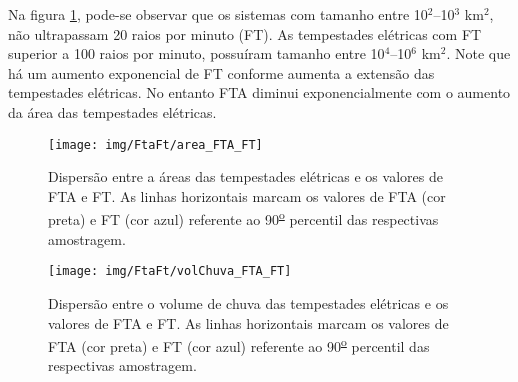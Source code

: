 Na figura \ref{areaFTAFTA}, pode-se observar que os sistemas com tamanho entre 10$^2$--10$^3$ km$^2$, não ultrapassam 20 raios por minuto (FT). As tempestades elétricas com FT superior a 100 raios por minuto, possuíram tamanho entre 10$^{4}$--10$^{6}$ km$^2$. Note que há um aumento exponencial de FT conforme aumenta a extensão das tempestades elétricas. No entanto FTA diminui exponencialmente com o aumento da área das tempestades elétricas.


\begin{figure}[!ht]
  \centering
  \texttt{[image: img/FtaFt/area\_FTA\_FT]}   
  \caption{Dispersão entre a áreas das tempestades elétricas e os valores de FTA e FT. As linhas horizontais marcam os valores de FTA (cor preta) e FT (cor azul) referente ao 90\textsuperscript{\underline{o}} percentil das respectivas amostragem.}
  \label{areaFTAFTA}  
\end{figure}

\begin{figure}[!hb]
  \centering 
  \texttt{[image: img/FtaFt/volChuva\_FTA\_FT]}
  \caption{Dispersão entre o volume de chuva das tempestades elétricas e os valores de FTA e FT.  As linhas horizontais marcam os valores de FTA (cor preta) e FT (cor azul) referente ao 90\textsuperscript{\underline{o}} percentil das respectivas amostragem.}
  \label{volchuvaFTAFT}
\end{figure}


